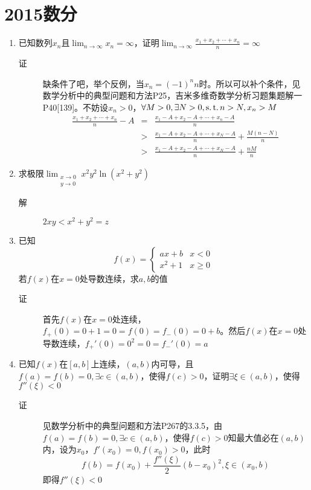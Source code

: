 \section{2015数分}
\begin{enumerate}
\item 已知数列$x_n$且$\lim_{n \to \infty} x_n = \infty$，证明$\lim_{n \to \infty}\frac{x_1+x_2+\cdots+x_n}{n}=\infty$
\begin{description}
\item[证] 缺条件了吧，举个反例，当$x_n=(-1)^nn$时。所以可以补个条件，见数学分析中的典型问题和方法P25，吉米多维奇数学分析习题集题解一P40[139]。不妨设$x_n>0$，$\forall M>0,\exists N>0,\operatorname{s.t.} n>N,x_n>M$
\begin{eqnarray*}
\frac{x_1+x_2+\cdots+x_n}{n} - A& = &\frac{x_1-A+x_2-A+\cdots+x_n-A}{n}\\
& > &\frac{x_1-A+x_2-A+\cdots+x_N-A}{n}+ \frac{M(n-N)}{n}\\
& > & \frac{x_1-A+x_2-A+\cdots+x_N-A}{n}+ \frac{nM}{n}
\end{eqnarray*}
\end{description}


\item 求极限$\lim_{\substack{x \to 0 \\ y \to 0}} x^2y^2\ln(x^2+y^2)$
\begin{description}
\item[解] $2xy<x^2+y^2=z$
\end{description}

\item 已知
\[
f(x) = \begin{cases}
ax+b &  x < 0 \\
x^2+1 &  x \geq 0
\end{cases}
\]
若$f(x)$在$x=0$处导数连续，求$a,b$的值
\begin{description}
\item[证] 首先$f(x)$在$x=0$处连续，$f_+(0) = 0+1=0=f(0)=f_-(0)=0+b$。然后$f(x)$在$x=0$处导数连续，$f_+'(0) = 0^2=0=f_-'(0)=a$
\end{description}


\item 已知$f(x)$在$[a,b]$上连续，$(a,b)$内可导，且$f(a)=f(b)=0,\exists c \in (a,b)$，使得$f(c)>0$，证明$\exists \xi \in (a,b)$，使得$f''(\xi)<0$
\begin{description}
\item[证] 见数学分析中的典型问题和方法P267的3.3.5，由$f(a)=f(b)=0,\exists c \in (a,b)$，使得$f(c)>0$知最大值必在$(a,b)$内，设为$x_0$，$f'(x_0)=0,f(x_0)>0$，此时
\[
f(b)= f(x_0) +\frac{f''(\xi)}{2}(b-x_0)^2,\xi \in (x_0,b)
\]
即得$f''(\xi)<0$
\end{description}


\end{enumerate}
